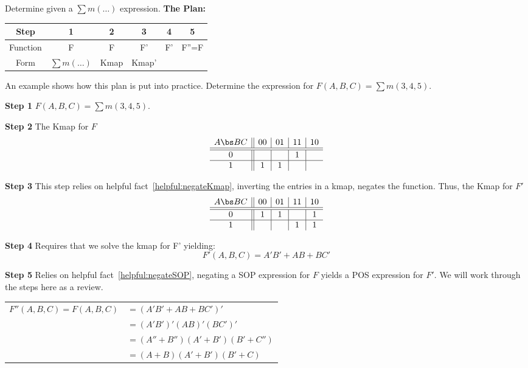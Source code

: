 \begin{process}{Determine \POSmin given a $\sum m(\ldots)$ expression.}
\label{process:minimizationSumToPOS}
\textbf{The Plan:}

\begin{tabular}{|c|c|c|c|c|c|}\hline
Step	  & 1  & 2  & 3  & 4  & 5   \\ \hline
Function  & F  & F  & F' & F' & F''=F \\ \hline
Form	  & $\sum m(\ldots)$ & Kmap & Kmap' & \SOPmin & \POSmin \\ \hline
\end{tabular}
\vspace{0.2cm}

An example shows how this plan is put into practice.
Determine the \POSmin expression for $F(A,B,C) = \sum m(3,4,5)$.

\textbf{Step 1} $F(A,B,C) = \sum m(3,4,5)$.

\textbf{Step 2} The Kmap for $F$ 
$$ \begin{array} {c||c|c|c|c}
        A \bs BC & 00 & 01 & 11 & 10 \\ \hline \hline
        0        &    &    & 1  &    \\ \hline
        1        & 1  & 1  &    &    \\ 
\end{array} $$

\textbf{Step 3} This step relies on helpful fact~\ref{helpful:negateKmap}, 
inverting the entries in a kmap, negates the function.  Thus, the Kmap for $F'$ 
$$ \begin{array} {c||c|c|c|c}
        A \bs BC & 00 & 01 & 11 & 10 \\ \hline \hline
        0        & 1  & 1  &    & 1  \\ \hline
        1        &    &    & 1  & 1  \\ 
\end{array} $$

\textbf{Step 4} Requires that we solve the kmap for F' yielding:
$$F'(A,B,C)= A'B'+AB+BC'$$

\textbf{Step 5} Relies on helpful fact~\ref{helpful:negateSOP},
negating a SOP expression for $F$ yields a POS expression
for $F'$.  We will work through the steps here as a review.

\begin{tabular}[ht]{ll}
$F''(A,B,C) = F(A,B,C)$		& 	$= (A'B'+AB+BC')'$			\\
							&	$= (A'B')'(AB)'(BC')'		$		\\
							&	$= (A'' + B'')(A' + B')(B' + C'')$		\\
							&	$= (A+B)(A'+B')(B'+C) $			\\
\end{tabular}
\end{process}
 

